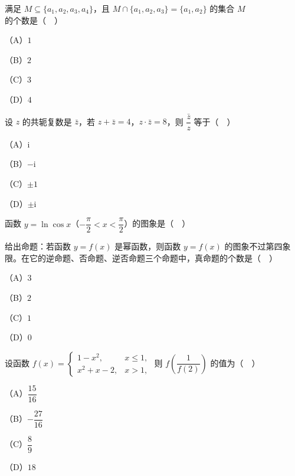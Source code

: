 


\begin{question}
满足 $M\subseteq\{a_1,a_2,a_3,a_4\}$，且 $M\cap\{a_1,a_2,a_3\}=\{a_1,a_2\}$ 的集合 $M$ 的个数是（　）

（A）$1$

（B）$2$

（C）$3$

（D）$4$

\end{question}
\begin{question}
设 $z$ 的共轭复数是 $\bar z$，若 $z+\bar z=4$，$z\cdot\bar z=8$，则 $\dfrac{\bar z}{z}$ 等于（　）

（A）$\mathrm i$

（B）$-\mathrm i$

（C）$\pm1$

（D）$\pm\mathrm i$

\Needspace{0.4\textheight}
\end{question}
\begingroup
\renewenvironment{question}{\Needspace{0.42\textheight}}{}
\begin{question}
函数 $y=\ln\cos x$（$-\dfrac{\pi}{2}<x<\dfrac{\pi}{2}$）的图象是（　）
\nopagebreak[4]
\begin{center}\end{center}
\nopagebreak[4]
\end{question}
\endgroup
\begin{question}
给出命题：若函数 $y=f(x)$ 是幂函数，则函数 $y=f(x)$ 的图象不过第四象限。在它的逆命题、否命题、逆否命题三个命题中，真命题的个数是（　）

（A）$3$

（B）$2$

（C）$1$

（D）$0$

\end{question}
\begin{question}
设函数 $f(x)=\begin{cases}1-x^2,&x\leqslant1,\\ x^2+x-2,&x>1,\end{cases}$ 则 $f\left(\dfrac1{f(2)}\right)$ 的值为（　）

（A）$\dfrac{15}{16}$

（B）$-\dfrac{27}{16}$

（C）$\dfrac89$

（D）$18$

\Needspace{0.4\textheight}
\end{question}
